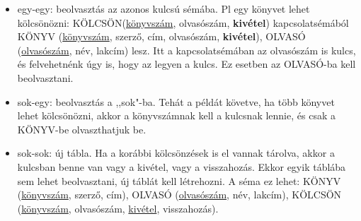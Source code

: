 \documentclass[margin=0px]{article}
\begin{document}
\begin{itemize}
    \item egy-egy: beolvasztás az azonos kulcsú sémába. Pl egy könyvet lehet kölcsönözni: KÖLCSÖN(\underline{könyvszám}, olvasószám, \textbf{kivétel}) kapcsolatsémából KÖNYV (\underline{könyvszám}, szerző, cím, olvasószám, \textbf{kivétel}), OLVASÓ (\underline{olvasószám}, név, lakcím) lesz. Itt a kapcsolatsémában az olvasószám is kulcs, és felvehetnénk úgy is, hogy az legyen a kulcs. Ez esetben az OLVASÓ-ba kell beolvasztani.
    \item sok-egy: beolvasztás a ,,sok"-ba. Tehát a példát követve, ha több könyvet lehet kölcsönözni, akkor a könyvszámnak kell a kulcsnak lennie, és csak a KÖNYV-be olvaszthatjuk be.
    \item sok-sok: új tábla. Ha a korábbi kölcsönzések is el vannak tárolva, akkor a kulcsban benne van vagy a kivétel, vagy a visszahozás. Ekkor egyik táblába sem lehet beolvasztani, új táblát kell létrehozni. A séma ez lehet: KÖNYV (\underline{könyvszám}, szerző, cím), OLVASÓ (\underline{olvasószám}, név, lakcím), KÖLCSÖN (\underline{könyvszám}, olvasószám, \underline{kivétel}, visszahozás).
\end{itemize}
\end{document}
